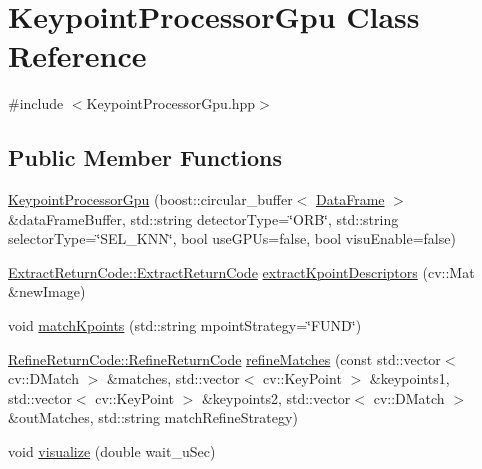 \hypertarget{classKeypointProcessorGpu}{}\section{Keypoint\+Processor\+Gpu Class Reference}
\label{classKeypointProcessorGpu}


{\ttfamily \#include $<$Keypoint\+Processor\+Gpu.\+hpp$>$}

\subsection*{Public Member Functions}
\begin{DoxyCompactItemize}
\item 
\hyperlink{classKeypointProcessorGpu_ad08f4085504007fd8a96b4bdd8ee3ecc}{Keypoint\+Processor\+Gpu} (boost\+::circular\+\_\+buffer$<$ \hyperlink{structDataFrame}{Data\+Frame} $>$ \&data\+Frame\+Buffer, std\+::string detector\+Type=\char`\"{}O\+RB\char`\"{}, std\+::string selector\+Type=\char`\"{}S\+E\+L\+\_\+\+K\+NN\char`\"{}, bool use\+G\+P\+Us=false, bool visu\+Enable=false)
\item 
\hyperlink{namespaceExtractReturnCode_a88d3d56de717f250bf48793769dd57ba}{Extract\+Return\+Code\+::\+Extract\+Return\+Code} \hyperlink{classKeypointProcessorGpu_a927a3d8480e8da505524c354e5c02c83}{extract\+Kpoint\+Descriptors} (cv\+::\+Mat \&new\+Image)
\item 
void \hyperlink{classKeypointProcessorGpu_af195f83c19b58a9fedeb50ac3baaa8b3}{match\+Kpoints} (std\+::string mpoint\+Strategy=\char`\"{}F\+U\+ND\char`\"{})
\item 
\hyperlink{namespaceRefineReturnCode_a54e2cd5f4af90ff2df55bf63455d1959}{Refine\+Return\+Code\+::\+Refine\+Return\+Code} \hyperlink{classKeypointProcessorGpu_abdbb860bb800e122dee4c76fcf596fc5}{refine\+Matches} (const std\+::vector$<$ cv\+::\+D\+Match $>$ \&matches, std\+::vector$<$ cv\+::\+Key\+Point $>$ \&keypoints1, std\+::vector$<$ cv\+::\+Key\+Point $>$ \&keypoints2, std\+::vector$<$ cv\+::\+D\+Match $>$ \&out\+Matches, std\+::string match\+Refine\+Strategy)
\item 
void \hyperlink{classKeypointProcessorGpu_a192bc98425b2bc0bea56ae024d9584b3}{visualize} (double wait\+\_\+u\+Sec)
\end{DoxyCompactItemize}
